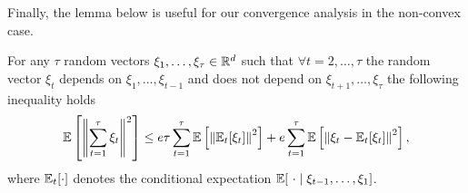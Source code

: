 Finally, the lemma below is useful for our convergence analysis in the non-convex case.
\begin{lemma}\label{lem:lemma_i_1_gorbunov}
	For any $\tau$ random vectors $\xi_1,\ldots,\xi_\tau\in\mathbb{R}^d$ such that $\forall t=2,\ldots,\tau$ the random vector $\xi_t$ depends on $\xi_{1},\ldots,\xi_{t-1}$ and does not depend on $\xi_{t+1},\ldots,\xi_{\tau}$ the following inequality holds
	\begin{equation}
		\mathbb{E}\left[\left\|\sum\limits_{t=1}^\tau\xi_t\right\|^2\right] \le e\tau\sum\limits_{t=1}^\tau\mathbb{E}\left[\left\|\mathbb{E}_t[\xi_{t}]\right\|^2\right] + e\sum\limits_{t=1}^\tau\mathbb{E}\left[\left\|\xi_t-\mathbb{E}_t[\xi_{t}]\right\|^2\right], \label{eq:lemma_i_1_gorbunov}
	\end{equation}
	where $\mathbb{E}_t[\cdot]$ denotes the conditional expectation $\mathbb{E}[\ \cdot\mid \xi_{t-1},\ldots,\xi_1]$.
\end{lemma}


